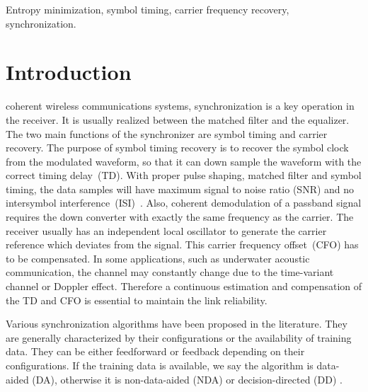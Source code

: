 \documentclass[journal,comsoc]{IEEEtran}
\begin{document}
\begin{IEEEkeywords}
Entropy minimization, symbol timing, carrier frequency recovery, synchronization.
\end{IEEEkeywords}

\IEEEpeerreviewmaketitle

\section{Introduction}
\label{sec:intro}
 coherent wireless communications systems, synchronization is a key operation in the receiver.
It is usually realized between the matched filter and the equalizer.
The two main functions of the synchronizer are symbol timing and carrier recovery.
The purpose of symbol timing recovery is to recover the symbol clock from the modulated waveform, so that it can down sample the waveform with the correct timing delay~(TD).
With proper pulse shaping, matched filter and symbol timing, the data samples will have maximum signal to noise ratio (SNR) and no intersymbol interference~(ISI)~\cite{mengali1997synchronization}.
Also, coherent demodulation of a passband signal requires the down converter with exactly the same frequency as the carrier. 
The receiver usually has an independent local oscillator to generate the carrier reference which deviates from the signal.  
This carrier frequency offset~(CFO) has to be compensated. 
In some applications, such as underwater acoustic communication, the channel may constantly change due to the time-variant channel or Doppler effect. 
Therefore a continuous estimation and compensation of the TD and CFO is essential to maintain the link reliability.

Various synchronization algorithms have been proposed in the literature.
They are generally characterized by their configurations or the availability of training data.
They can be either feedforward or feedback depending on their configurations.
If the training data is available, we say the algorithm is data-aided (DA), otherwise it is non-data-aided (NDA) or decision-directed (DD) \cite{mengali1997synchronization}.

\end{document}
